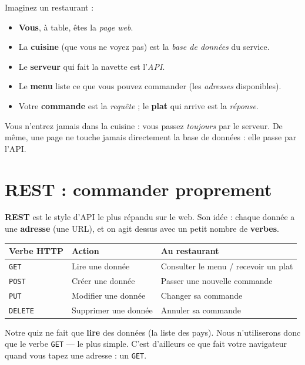 \documentclass[11pt,a4paper]{article}
\newcommand{\code}[1]{\texttt{#1}}
\begin{document}
\begin{infobox}
Imaginez un restaurant :
\begin{itemize}[leftmargin=*,noitemsep]
  \item \textbf{Vous}, à table, êtes la \emph{page web}.
  \item La \textbf{cuisine} (que vous ne voyez pas) est la \emph{base de données} du service.
  \item Le \textbf{serveur} qui fait la navette est l'\emph{API}.
  \item Le \textbf{menu} liste ce que vous pouvez commander (les \emph{adresses} disponibles).
  \item Votre \textbf{commande} est la \emph{requête} ; le \textbf{plat} qui arrive est la \emph{réponse}.
\end{itemize}
Vous n'entrez jamais dans la cuisine : vous passez \emph{toujours} par le serveur. De même, une page ne touche jamais directement la base de données : elle passe par l'API.
\end{infobox}

\section{REST : commander proprement}

\textbf{REST} est le style d'API le plus répandu sur le web. Son idée : chaque donnée a une \textbf{adresse} (une URL), et on agit dessus avec un petit nombre de \textbf{verbes}.

\begin{center}
\begin{tabular}{l l l}
\toprule
\textbf{Verbe HTTP} & \textbf{Action} & \textbf{Au restaurant} \\
\midrule
\code{GET}    & Lire une donnée      & Consulter le menu / recevoir un plat \\
\code{POST}   & Créer une donnée     & Passer une nouvelle commande \\
\code{PUT}    & Modifier une donnée  & Changer sa commande \\
\code{DELETE} & Supprimer une donnée & Annuler sa commande \\
\bottomrule
\end{tabular}
\end{center}

\begin{retenirbox}
Notre quiz ne fait que \textbf{lire} des données (la liste des pays). Nous n'utiliserons donc que le verbe \code{GET} --- le plus simple. C'est d'ailleurs ce que fait votre navigateur quand vous tapez une adresse : un \code{GET}.
\end{retenirbox}
\end{document}
